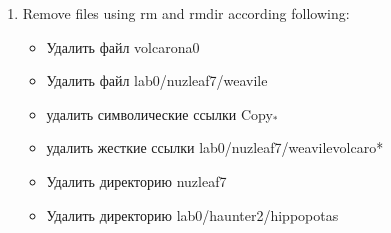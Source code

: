 \documentclass[11pt]{article}
\begin{document}
\begin{enumerate}
\begin{itemize}
\end{itemize}
\item Remove files using rm and rmdir according following:
\begin{itemize}
\item Удалить файл volcarona0
\item Удалить файл lab0/nuzleaf7/weavile
\item удалить символические ссылки Copy\(_{\text{*}}\)
\item удалить жесткие ссылки lab0/nuzleaf7/weavilevolcaro*
\item Удалить директорию nuzleaf7
\item Удалить директорию lab0/haunter2/hippopotas
\end{itemize}
\end{enumerate}
\end{document}
